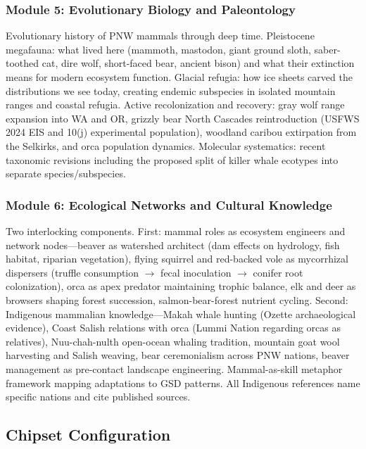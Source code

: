 \documentclass[11pt,letterpaper]{article}
\begin{document}
\subsubsection{Module 5: Evolutionary Biology and Paleontology}
Evolutionary history of PNW mammals through deep time. Pleistocene megafauna: what lived here (mammoth, mastodon, giant ground sloth, saber-toothed cat, dire wolf, short-faced bear, ancient bison) and what their extinction means for modern ecosystem function. Glacial refugia: how ice sheets carved the distributions we see today, creating endemic subspecies in isolated mountain ranges and coastal refugia. Active recolonization and recovery: gray wolf range expansion into WA and OR, grizzly bear North Cascades reintroduction (USFWS 2024 EIS and 10(j) experimental population), woodland caribou extirpation from the Selkirks, and orca population dynamics. Molecular systematics: recent taxonomic revisions including the proposed split of killer whale ecotypes into separate species/subspecies.

\subsubsection{Module 6: Ecological Networks and Cultural Knowledge}
Two interlocking components. First: mammal roles as ecosystem engineers and network nodes---beaver as watershed architect (dam effects on hydrology, fish habitat, riparian vegetation), flying squirrel and red-backed vole as mycorrhizal dispersers (truffle consumption $\rightarrow$ fecal inoculation $\rightarrow$ conifer root colonization), orca as apex predator maintaining trophic balance, elk and deer as browsers shaping forest succession, salmon-bear-forest nutrient cycling. Second: Indigenous mammalian knowledge---Makah whale hunting (Ozette archaeological evidence), Coast Salish relations with orca (Lummi Nation regarding orcas as relatives), Nuu-chah-nulth open-ocean whaling tradition, mountain goat wool harvesting and Salish weaving, bear ceremonialism across PNW nations, beaver management as pre-contact landscape engineering. Mammal-as-skill metaphor framework mapping adaptations to GSD patterns. All Indigenous references name specific nations and cite published sources.

\subsection{Chipset Configuration}
\end{document}
